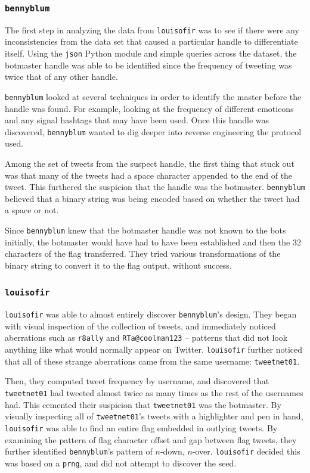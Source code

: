 \documentclass[11pt, oneside]{article} %
\numberwithin{equation}{section} %
\numberwithin{figure}{section} %
\numberwithin{table}{section} %
\renewcommand{\c}[1]{\texttt{#1}}
\newcommand{\code}[1]{\c{#1}}
\newcommand{\teambb}{\c{bennyblum}}
\newcommand{\teamol}{\c{louisofir}}
\begin{document}
		\subsubsection{\teambb{}}
			The first step in analyzing the data from \teamol{} was to see if there were any inconsistencies from the data set that caused a particular handle to differentiate itself. Using the \c{json} Python module and simple queries across the dataset, the botmaster handle was able to be identified since the frequency of tweeting was twice that of any other handle.

			\teambb{} looked at several techniques in order to identify the master before the handle was found. For example, looking at the frequency of different emoticons and any signal hashtags that may have been used. Once this handle was discovered, \teambb{} wanted to dig deeper into reverse engineering the protocol used.

			Among the set of tweets from the suspect handle, the first thing that stuck out was that many of the tweets had a space character appended to the end of the tweet. This furthered the suspicion that the handle was the botmaster. \teambb{} believed that a binary string was being encoded based on whether the tweet had a space or not.

			Since \teambb{} knew that the botmaster handle was not known to the bots initially, the botmaster would have had to have been established and then the 32 characters of the flag transferred. They tried various transformations of the binary string to convert it to the flag output, without success. 

		\subsubsection{\teamol{}}
	\teamol{} was able to almost entirely discover \teambb{}'s design. They began with visual inspection of the collection of tweets, and immediately noticed aberrations such as \code{r8ally} and \code{RTa@coolman123} -- patterns that did not look anything like what would normally appear on Twitter. \teamol{} further noticed that all of these strange aberrations came from the same username: \c{tweetnet01}.

	Then, they computed tweet frequency by username, and discovered that \code{tweetnet01} had tweeted almost twice as many times as the rest of the usernames had. This cemented their suspicion that \code{tweetnet01} was the botmaster. By visually inspecting all of \code{tweetnet01}'s tweets with a highlighter and pen in hand, \teamol{} was able to find an entire flag embedded in outlying tweets. By examining the pattern of flag character offset and gap between flag tweets, they further identified \teambb{}'s pattern of $n$-down, $n$-over. \teamol{} decided this was based on a \c{prng}, and did not attempt to discover the seed.
\end{document}
